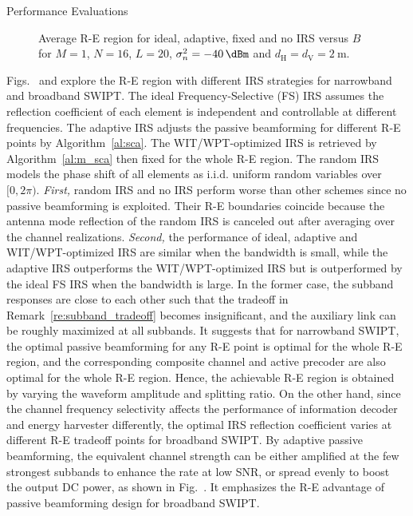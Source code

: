 \documentclass[journal]{IEEEtran}
\begin{document}
\begin{section}{Performance Evaluations}
		\begin{figure}[!t]
			\centering
			\subfloat[$B=\SI{1}{\MHz}$\label{fi:re_irs_1mhz}]{
				\resizebox{0.45\columnwidth}{!}{
					
				}
			}
			\subfloat[$B=\SI{10}{\MHz}$\label{fi:re_irs_10mhz}]{
				\resizebox{0.45\columnwidth}{!}{
					
				}
			}
			\caption{Average R-E region for ideal, adaptive, fixed and no IRS versus $B$ for $M=1$, $N=16$, $L=20$, $\sigma_n^2=\SI{-40}{\dBm}$ and $d_{\mathrm{H}}=d_{\mathrm{V}}=\SI{2}{\meter}$.}
		\end{figure}

		Figs.~ and  explore the R-E region with different IRS strategies for narrowband and broadband SWIPT. The ideal Frequency-Selective (FS) IRS assumes the reflection coefficient of each element is independent and controllable at different frequencies. The adaptive IRS adjusts the passive beamforming for different R-E points by Algorithm~\ref{al:sca}. The WIT/WPT-optimized IRS is retrieved by Algorithm~\ref{al:m_sca} then fixed for the whole R-E region. The random IRS models the phase shift of all elements as i.i.d. uniform random variables over $[0, 2\pi)$. \emph{First,} random IRS and no IRS perform worse than other schemes since no passive beamforming is exploited. Their R-E boundaries coincide because the antenna mode reflection of the random IRS is canceled out after averaging over the channel realizations. \emph{Second,} the performance of ideal, adaptive and WIT/WPT-optimized IRS are similar when the bandwidth is small, while the adaptive IRS outperforms the WIT/WPT-optimized IRS but is outperformed by the ideal FS IRS when the bandwidth is large. In the former case, the subband responses are close to each other such that the tradeoff in Remark~\ref{re:subband_tradeoff} becomes insignificant, and the auxiliary link can be roughly maximized at all subbands. It suggests that for narrowband SWIPT, the optimal passive beamforming for any R-E point is optimal for the whole R-E region, and the corresponding composite channel and active precoder are also optimal for the whole R-E region. Hence, the achievable R-E region is obtained by varying the waveform amplitude and splitting ratio. On the other hand, since the channel frequency selectivity affects the performance of information decoder and energy harvester differently, the optimal IRS reflection coefficient varies at different R-E tradeoff points for broadband SWIPT. By adaptive passive beamforming, the equivalent channel strength can be either amplified at the few strongest subbands to enhance the rate at low SNR, or spread evenly to boost the output DC power, as shown in Fig.~. It emphasizes the R-E advantage of passive beamforming design for broadband SWIPT.


\end{section}
\end{document}
